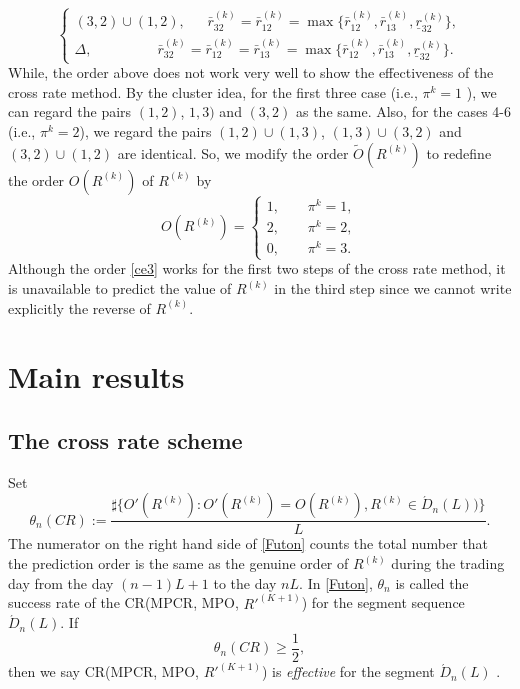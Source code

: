 \documentclass[11pt]{article}
\numberwithin{equation}{section}
\begin{document}
\begin{rem}
{\begin{equation}
\begin{cases}
(3,2)\cup (1,2),~~~~~~~\bar r_{32}^{(k)}=\bar r_{12}^{(k)}=\max\{\bar r_{12}^{(k)}, \bar r_{13}^{(k)},\underline r_{32}^{(k)}\},\\
\Delta,~~~~~~~~~~~~~~~~~~~~~\bar r_{32}^{(k)}=\bar r_{12}^{(k)}=\bar
r_{13}^{(k)}=\max\{\bar r_{12}^{(k)}, \bar r_{13}^{(k)},\underline
r_{32}^{(k)}\}.
\end{cases}
 \end{equation}
While, the order above does not work very well to show the effectiveness of the cross rate method. By the cluster idea, for the first three case (i.e., $\pi^{k}=1$ ), we can regard the pairs  $(1,2)$, $1,3)$ and $(3,2)$ as the same. Also, for the cases 4-6 (i.e., $\pi^{k}=2$), we  regard the pairs $(1,2)\cup(1,3)$, $(1,3)\cup(3,2)$ and $(3,2)\cup (1,2)$ are identical. So, we modify the order $\tilde O(R^{(k)})$  to redefine the order $O(R^{(k)})$ of $R^{(k)}$ by
\begin{equation}\label{ce3}
O(R^{(k)})=
\begin{cases}
1,~~~~~~~~~\pi^{k}=1,\\
2,~~~~~~~~~\pi^{k}=2,\\
0,~~~~~~~~~\pi^{k}=3.
\end{cases}
\end{equation}
Although the order \eqref{ce3} works for the first two steps of the cross rate method, it is unavailable to predict the value of
$R^{(k)}$ in the third step since we cannot write explicitly the reverse of $R^{(k)}$.}
\end{rem}
 
\section{Main results}
 
\subsection{The cross rate scheme} 
Set 
 \begin{equation}\label{Futon}
\theta_n(CR):=\frac{\sharp\{O'(R^{(k)}):O'(R^{(k)})=O(R^{(k)}), R^{(k)}\in \acute{D}_n(L))\}}{L}.
\end{equation}
The numerator on the right hand side of \eqref{Futon} counts the total number that  the prediction order is the same as the genuine order of $R^{(k)}$ during the trading day from the day $(n-1)L+1$ to the day $nL.$ In \eqref{Futon}, $\theta_n$ is called 
 the success rate of the CR(MPCR, MPO, $R'^{(K+1)}$) for the segment sequence $ \acute{D}_n(L)$. 
If
\begin{equation*}
\theta_n(CR)\geqslant \frac{1}{2},
\end{equation*}
then we say CR(MPCR, MPO, $R'^{(K+1)}$) is \textit{effective} for the segment $ \acute{D}_n(L)$ . 
\end{document}
